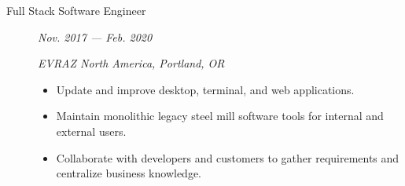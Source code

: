 \documentclass{article}
\begin{document}
\begin{description}
	\item[Full Stack Software Engineer] \hfill \textit{Nov. 2017 — Feb. 2020}
		
        \textit{EVRAZ North America, Portland, OR}
        \begin{itemize}     
            \item Update and improve desktop, terminal, and web applications.
            \item Maintain monolithic legacy steel mill software tools for internal and external users.
            \item Collaborate with developers and customers to gather requirements and centralize business knowledge.
        \end{itemize}
        
    \end{description}
\end{document}
